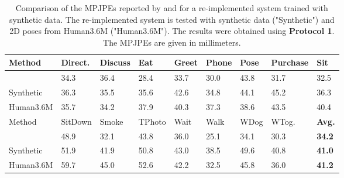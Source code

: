 \begin{table}[]	
	\centering
	\begin{tabularx}{\textwidth}{l *{8}{Y}}
		\toprule
		Method & Direct. & Discuss & Eat & Greet & Phone & Pose & Purchase & Sit \\
		\midrule
		\citet{drover18} & 34.3 & 36.4 & 28.4 & 33.7 & 30.0 & 43.8 & 31.7 & 32.5\\
		Synthetic & 36.3 & 35.5 & 35.6 & 42.6 & 34.8 & 44.1 & 45.2 & 36.3 \\
		Human3.6M & 35.7 & 34.2 & 37.9 & 40.3 & 37.3 & 38.6 & 43.5 & 40.4 \\
		\bottomrule
		\toprule
		Method & SitDown & Smoke & TPhoto & Wait & Walk & WDog & WTog. & \textbf{Avg.}\\
		\midrule
		\citet{drover18} & 48.9 & 32.1 & 43.8 & 36.0 & 25.1 & 34.1 & 30.3 & \textbf{34.2}\\
		Synthetic & 51.9 & 41.9 & 50.8 & 43.0 & 38.5 & 49.6 & 40.8 & \textbf{41.0} \\
		Human3.6M & 59.7 & 45.0 & 52.6 & 42.2 & 32.5 & 45.8 & 36.0 & \textbf{41.2} \\
		\bottomrule
	\end{tabularx}
	\caption{
		Comparison of the MPJPEs reported by \citet{drover18} and for a re-implemented system trained with synthetic data. 
		The re-implemented system is tested with synthetic data ("Synthetic") and 2D poses from Human3.6M  \cite{ionescu14} ("Human3.6M").
		The results were obtained using \textbf{Protocol 1}. The MPJPEs are given in millimeters.
	 }
	\label{tbl:results-original-protocol1}
\end{table}